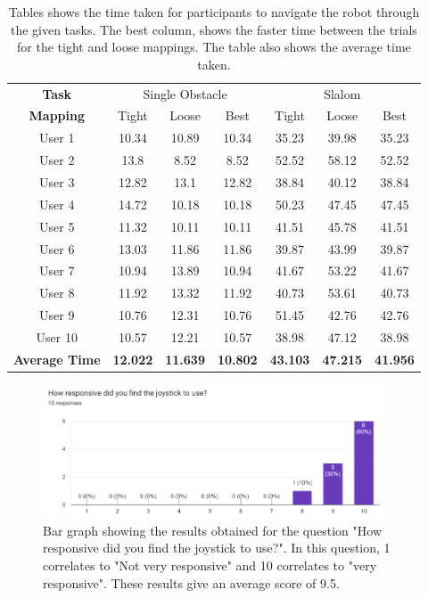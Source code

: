 \documentclass{l4proj}
\begin{document}
\begin{appendices}
\begin{table}[!ht]
\centering
\caption{Tables shows the time taken for participants to navigate the robot through the given tasks. The best column, shows the faster time between the trials for the tight and loose mappings. The table also shows the average time taken.}
\label{tab:joystick-times}
\begin{tabular}{ccccccc}
\textbf{Task} & \multicolumn{3}{c}{Single Obstacle} & \multicolumn{3}{c}{Slalom} \\
\textbf{Mapping} & Tight & Loose & Best & Tight & Loose & Best \\
User 1 & 10.34 & 10.89 & 10.34 & 35.23 & 39.98 & 35.23 \\
User 2 & 13.8 & 8.52 & 8.52 & 52.52 & 58.12 & 52.52 \\
User 3 & 12.82 & 13.1 & 12.82 & 38.84 & 40.12 & 38.84 \\
User 4 & 14.72 & 10.18 & 10.18 & 50.23 & 47.45 & 47.45 \\
User 5 & 11.32 & 10.11 & 10.11 & 41.51 & 45.78 & 41.51 \\
User 6 & 13.03 & 11.86 & 11.86 & 39.87 & 43.99 & 39.87 \\
User 7 & 10.94 & 13.89 & 10.94 & 41.67 & 53.22 & 41.67 \\
User 8 & 11.92 & 13.32 & 11.92 & 40.73 & 53.61 & 40.73 \\
User 9 & 10.76 & 12.31 & 10.76 & 51.45 & 42.76 & 42.76 \\
User 10 & 10.57 & 12.21 & 10.57 & 38.98 & 47.12 & 38.98 \\
\textbf{Average Time} & \textbf{12.022} & \textbf{11.639} & \textbf{10.802} & \textbf{43.103} & \textbf{47.215} & \textbf{41.956}
\end{tabular}
\end{table}

\begin{figure}
    \centering
    \includegraphics[width=0.9\textwidth]{images/responsive-joystick-results.png}
    \caption{Bar graph showing the results obtained for the question "How responsive did you find the joystick to use?". In this question, 1 correlates to "Not very responsive" and 10 correlates to "very responsive". These results give an average score of 9.5.}
    \label{fig:joystick-responsive-results}
\end{figure}



\end{appendices}
\end{document}
